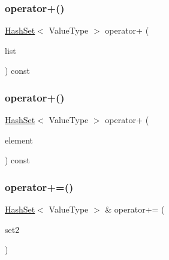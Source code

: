 \subsubsection{\texorpdfstring{operator+()}{operator+()}\hspace{0.1cm}{\footnotesize\ttfamily [2/3]}}
{\footnotesize\ttfamily \mbox{\hyperlink{classHashSet}{Hash\+Set}}$<$ Value\+Type $>$ operator+ (\begin{DoxyParamCaption}\item[{std\+::initializer\+\_\+list$<$ Value\+Type $>$}]{list }\end{DoxyParamCaption}) const}

\mbox{\label{classHashSet_a4fd31573d1b31ecf8fe76e817fc24c29}} 
\subsubsection{\texorpdfstring{operator+()}{operator+()}\hspace{0.1cm}{\footnotesize\ttfamily [3/3]}}
{\footnotesize\ttfamily \mbox{\hyperlink{classHashSet}{Hash\+Set}}$<$ Value\+Type $>$ operator+ (\begin{DoxyParamCaption}\item[{const Value\+Type \&}]{element }\end{DoxyParamCaption}) const}

\mbox{\label{classHashSet_ae5db24ba415c0583ad5bf2a82db4db54}} 
\subsubsection{\texorpdfstring{operator+=()}{operator+=()}\hspace{0.1cm}{\footnotesize\ttfamily [1/3]}}
{\footnotesize\ttfamily \mbox{\hyperlink{classHashSet}{Hash\+Set}}$<$ Value\+Type $>$ \& operator+= (\begin{DoxyParamCaption}\item[{const \mbox{\hyperlink{classHashSet}{Hash\+Set}}$<$ Value\+Type $>$ \&}]{set2 }\end{DoxyParamCaption})}

\mbox{\label{classHashSet_a56bdb6beeca7193ea3d4845d0e97a604}} 
